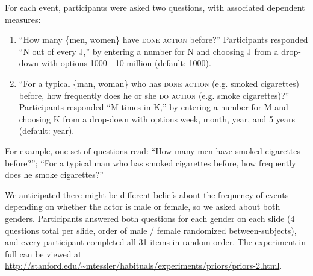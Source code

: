 \documentclass[10pt,letterpaper]{article}
\newcommand{\ndg}[1]{\textcolor{Green}{[ndg: #1]}}
\begin{document}
For each event, participants were asked two questions, with associated dependent measures:
\begin{enumerate}
\itemsep0em
\item ``How many \{men, women\} have \textsc{done action} before?'' Participants responded ``N out of every J,'' by entering a number for N and choosing J from a drop-down with options 1000 - 10 million (default: 1000).
% 
\item ``For a typical \{man, woman\} who has \textsc{done action}  (e.g. smoked cigarettes) before, how frequently does he or she \textsc{do action} (e.g. smoke cigarettes)?''  Participants responded ``M times in K,'' by entering a number for M and choosing K from a drop-down with options week, month, year, and 5 years (default: year).
%
\end{enumerate}
For example, one set of questions read: ``How many men have smoked cigarettes before?''; ``For a typical man who has smoked cigarettes before, how frequently does he smoke cigarettes?''

We anticipated there might be different beliefs about the frequency of events depending on whether the actor is male or female, so we asked about both genders. Participants answered both questions for each gender on each slide (4 questions total per slide, order of male / female randomized between-subjects), and every participant completed all 31 items in random order.
The experiment in full can be viewed at \url{http://stanford.edu/~mtessler/habituals/experiments/priors/priors-2.html}.
\end{document}
